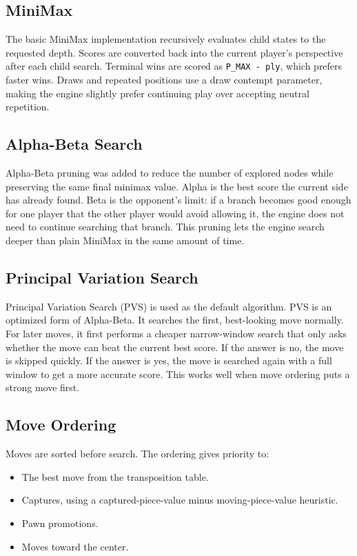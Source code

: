 \documentclass[11pt,a4paper]{article}
\begin{document}
\subsection{MiniMax}

The basic MiniMax implementation recursively evaluates child states to the
requested depth. Scores are converted back into the current player's
perspective after each child search. Terminal wins are scored as
\texttt{P\_MAX - ply}, which prefers faster wins. Draws and repeated positions
use a draw contempt parameter, making the engine slightly prefer continuing play
over accepting neutral repetition.

\subsection{Alpha-Beta Search}

Alpha-Beta pruning was added to reduce the number of explored nodes while
preserving the same final minimax value. Alpha is the best score the current
side has already found. Beta is the opponent's limit: if a branch becomes good
enough for one player that the other player would avoid allowing it, the engine
does not need to continue searching that branch. This pruning lets the engine
search deeper than plain MiniMax in the same amount of time.

\subsection{Principal Variation Search}

Principal Variation Search (PVS) is used as the default algorithm. PVS is an
optimized form of Alpha-Beta. It searches the first, best-looking move normally.
For later moves, it first performs a cheaper narrow-window search that only asks
whether the move can beat the current best score. If the answer is no, the move
is skipped quickly. If the answer is yes, the move is searched again with a full
window to get a more accurate score. This works well when move ordering puts a
strong move first.

\subsection{Move Ordering}

Moves are sorted before search. The ordering gives priority to:

\begin{itemize}[leftmargin=*]
    \item The best move from the transposition table.
    \item Captures, using a captured-piece-value minus moving-piece-value
    heuristic.
    \item Pawn promotions.
    \item Moves toward the center.
\end{itemize}
\end{document}
